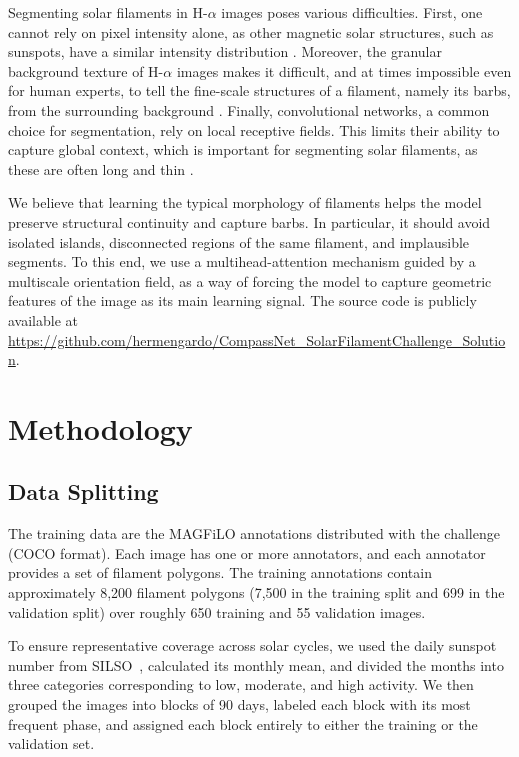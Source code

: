 \documentclass[sigconf]{acmart}
\begin{document}
    Segmenting solar filaments in H-$\alpha$ images poses various difficulties. First, one cannot rely on pixel intensity alone, as other magnetic solar structures, such as sunspots, have a similar intensity distribution \cite{ahmadzadeh2019filament_arxiv, solomon2025edgeattnet}. Moreover, the granular background texture of H-$\alpha$ images makes it difficult, and at times impossible even for human experts, to tell the fine-scale structures of a filament, namely its barbs, from the surrounding background \cite{ahmadzadeh2019filament_arxiv}. Finally, convolutional networks, a common choice for segmentation, rely on local receptive fields. This limits their ability to capture global context, which is important for segmenting solar filaments, as these are often long and thin \cite{solomon2025edgeattnet}.
    
    We believe that learning the typical morphology of filaments helps the model preserve structural continuity and capture barbs. In particular, it should avoid isolated islands, disconnected regions of the same filament, and implausible segments. To this end, we use a multihead-attention mechanism guided by a multiscale orientation field, as a way of forcing the model to capture geometric features of the image as its main learning signal. The source code is publicly available at \url{https://github.com/hermengardo/CompassNet_SolarFilamentChallenge_Solution}.

\section{Methodology}\label{sec:methodology}

\subsection{Data Splitting}\label{sec:splitting}
The training data are the MAGFiLO annotations distributed with the challenge (COCO format). Each image has one or more annotators, and each annotator provides a set of filament polygons. The training annotations contain approximately 8,200 filament polygons (7,500 in the training split and 699 in the validation split) over roughly 650 training and 55 validation images.

To ensure representative coverage across solar cycles, we used the daily sunspot number from SILSO~\cite{silso}, calculated its monthly mean, and divided the months into three categories corresponding to low, moderate, and high activity. We then grouped the images into blocks of 90 days, labeled each block with its most frequent phase, and assigned each block entirely to either the training or the validation set.
\end{document}
